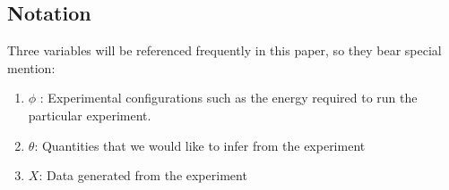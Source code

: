 \documentclass[10pt,journal,compsoc]{IEEEtran}
\begin{document}

\subsection{Notation}
Three variables will be referenced frequently in this paper, so they bear special mention:
\begin{enumerate}
\item $\phi$ : Experimental configurations such as the energy required to run the particular experiment.
\item $\theta$: Quantities that we would like to infer from the experiment
\item $X$: Data generated from the experiment
\end{enumerate}

% 




\end{document}
